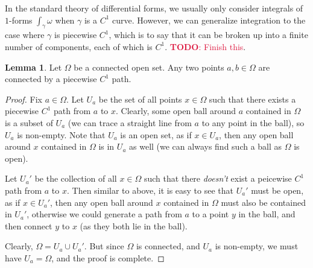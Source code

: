 \documentclass[aps,pra,showpacs,notitlepage,onecolumn,superscriptaddress,nofootinbib]{revtex4-1}
\newcommand{\pop}[1]{\textcolor{crimson}{#1}}
\theoremstyle{definition}
\newtheorem{lemma}{Lemma}[section]
\begin{document}
\noindent In the standard theory of differential forms, we usually only consider integrals of $1$-forms $\int_{\gamma} \omega$ when $\gamma$ is a $C^{1}$ curve. However, we can generalize integration to
the case where $\gamma$ is piecewise $C^{1}$, which is to say that it can be broken up into a finite number of components, each of which is $C^{1}$. \pop{\textbf{TODO}: Finish this}.

\begin{lemma}
  Let $\Omega$ be a connected open set. Any two points $a, b \in \Omega$ are connected by a piecewise $C^1$ path.
\end{lemma}
\begin{proof}
  Fix $a \in \Omega$. Let $U_a$ be the set of all points $x \in \Omega$ such that there exists a piecewise $C^1$ path from $a$ to $x$. Clearly, some open ball around $a$
  contained in $\Omega$ is a subset of $U_a$ (we can trace a straight line from $a$ to any point in the ball), so $U_a$ is non-empty. Note that $U_a$ is an open set, as if $x \in U_a$, then any open ball around $x$ contained in $\Omega$ is in $U_a$ as well (we can always find such a ball as $\Omega$ is open).

  Let $U_a'$ be the collection of all $x \in \Omega$ such that there \emph{doesn't} exist a peicewise $C^1$ path from $a$ to $x$. Then similar to above, it is easy to see that
  $U_a'$ must be open, as if $x \in U_a'$, then any open ball around $x$ contained in $\Omega$ must also be contained in $U_a'$, otherwise we could generate a path from $a$ to a point $y$
  in the ball, and then connect $y$ to $x$ (as they both lie in the ball).

  Clearly, $\Omega = U_a \cup U_a'$. But since $\Omega$ is connected, and $U_a$ is non-empty, we must have $U_a = \Omega$, and the proof is complete.
\end{proof}
\end{document}
